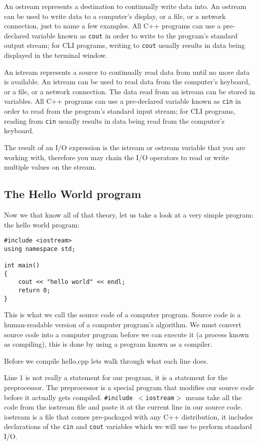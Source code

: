 \documentclass[a4paper,12pt]{article}
\begin{document}
An ostream represents a destination to continually write data into. An ostream can be used to write data to a computer's display, or a file, or a network connection, just to name a few examples. All C++ programs can use a pre-declared variable known as \texttt{cout} in order to write to the program's standard output stream; for CLI programs, writing to \texttt{cout} usually results in data being displayed in the terminal window.

An istream represents a source to continually read data from until no more data is available. An istream can be used to read data from the computer's keyboard, or a file, or a network connection. The data read from an istream can be stored in variables. All C++ programs can use a pre-declared variable known as \texttt{cin} in order to read from the program's standard input stream; for CLI programs, reading from \texttt{cin} usually results in data being read from the computer's keyboard.

The result of an I/O expression is the istream or ostream variable that you are working with, therefore you may chain the I/O operators to read or write multiple values on the stream.

\subsection*{The Hello World program}

Now we that know all of that theory, let us take a look at a very simple program: the hello world program:

\begin{lstlisting}[caption=hello.cpp]
#include <iostream>
using namespace std;

int main()
{
	cout << "hello world" << endl;
	return 0;
}
\end{lstlisting}

This is what we call the source code of a computer program. Source code is a human-readable version of a computer program's algorithm. We must convert source code into a computer program before we can execute it (a process known as compiling), this is done by using a program known as a compiler. 

Before we compile hello.cpp lets walk through what each line does.

Line 1 is not really a statement for our program, it is a statement for the preprocessor. The preprocessor is a special program that modifies our source code before it actually gets compiled. \texttt{\#include $<$iostream$>$} means take all the code from the iostream file and paste it at the current line in our source code. iostream is a file that comes pre-packaged with any C++ distribution, it includes declarations of the \texttt{cin} and \texttt{cout} variables which we will use to perform standard I/O. 
\end{document}
